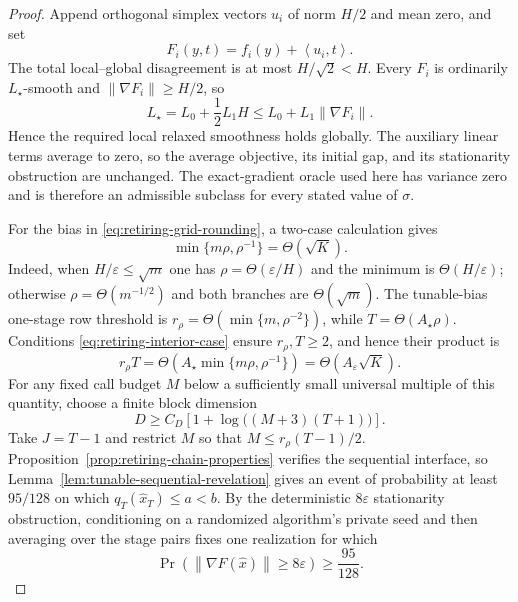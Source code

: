 \documentclass[11pt,a4paper]{article}
\newcommand{\eps}{\varepsilon}
\newcommand{\norm}[1]{\left\lVert #1\right\rVert}
\newcommand{\inner}[2]{\left\langle #1,#2\right\rangle}
\theoremstyle{remark}
\begin{document}
\begin{proof}
Append orthogonal simplex vectors $u_i$ of norm $H/2$ and mean zero, and set
\begin{equation}
 F_i(y,t)=f_i(y)+\inner{u_i}{t}.
 \label{eq:retiring-relaxed-embedding}
\end{equation}
The total local--global disagreement is at most $H/\sqrt2<H$.  Every $F_i$
is ordinarily $L_\star$-smooth and
$\norm{\nabla F_i}\ge H/2$, so
\[
 L_\star=L_0+\frac12L_1H
 \le L_0+L_1\norm{\nabla F_i}.
\]
Hence the required local relaxed smoothness holds globally.  The auxiliary
linear terms average to zero, so the average objective, its initial gap, and
its stationarity obstruction are unchanged.  The exact-gradient oracle used
here has variance zero and is therefore an admissible subclass for every
stated value of $\sigma$.

For the bias in \eqref{eq:retiring-grid-rounding}, a two-case calculation gives
\begin{equation}
 \min\{m\rho,\rho^{-1}\}
 =\Theta(\sqrt K).
 \label{eq:retiring-effective-size}
\end{equation}
Indeed, when $H/\eps\le\sqrt m$ one has
$\rho=\Theta(\eps/H)$ and the minimum is $\Theta(H/\eps)$; otherwise
$\rho=\Theta(m^{-1/2})$ and both branches are $\Theta(\sqrt m)$.
The tunable-bias one-stage row threshold is
$r_\rho=\Theta(\min\{m,\rho^{-2}\})$, while
$T=\Theta(A_\star\rho)$.  Conditions
\eqref{eq:retiring-interior-case} ensure $r_\rho,T\ge2$, and hence their
product is
\begin{equation}
 r_\rho T
 =\Theta\left(
 A_\star\min\{m\rho,\rho^{-1}\}
 \right)
 =\Theta(A_\eps\sqrt K).
 \label{eq:retiring-row-stage-product}
\end{equation}
For any fixed call budget $M$ below a sufficiently small universal multiple
of this quantity, choose a finite block dimension
\begin{equation}
 D\ge C_D\left[1+\log\bigl((M+3)(T+1)\bigr)\right].
 \label{eq:retiring-dimension}
\end{equation}
Take $J=T-1$ and restrict $M$ so that
$M\le r_\rho(T-1)/2$.  Proposition~\ref{prop:retiring-chain-properties}
verifies the sequential interface, so Lemma~\ref{lem:tunable-sequential-revelation} gives
an event of probability at least $95/128$ on which
$q_T(\widehat x_T)\le a<b$.  By the deterministic $8\eps$ stationarity
obstruction, conditioning on a randomized algorithm's private seed and then
averaging over the stage pairs fixes one realization for which
\begin{equation}
 \Pr\!\left(\norm{\nabla F(\widehat x)}\ge8\eps\right)
 \ge\frac{95}{128}.
 \label{eq:retiring-fixed-budget-failure}
\end{equation}


\end{proof}
\end{document}
